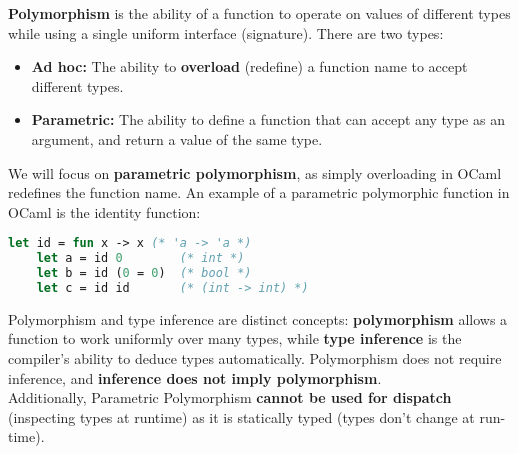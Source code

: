 \begin{Def}[Polymorphism]

    \textbf{Polymorphism} is the ability of a function to operate on values of different types while using a single uniform interface (signature).
    There are two types:
    \begin{itemize}
        \item \textbf{Ad hoc:} The ability to \textbf{overload} (redefine) a function name to accept different types.
        \item \textbf{Parametric:} The ability to define a function that can accept any type as an argument, and return a value of the same type.
    \end{itemize}
\end{Def}

\newpage
\noindent
We will focus on \textbf{parametric polymorphism}, as simply overloading in OCaml redefines the function name.
An example of a parametric polymorphic function in OCaml is the identity function:
\begin{lstlisting}[language=OCaml, numbers=none]
    let id = fun x -> x (* 'a -> 'a *)
    let a = id 0        (* int *)
    let b = id (0 = 0)  (* bool *)
    let c = id id       (* (int -> int) *)
\end{lstlisting}

\begin{Def}

    Polymorphism and type inference are distinct concepts: \textbf{polymorphism} allows a function to work uniformly over many types, while \textbf{type inference} is the compiler's ability to deduce types automatically. Polymorphism does not require inference, and \textbf{inference does not imply polymorphism}.\\

    \noindent
    Additionally, Parametric Polymorphism \textbf{cannot be used for dispatch} (inspecting types at runtime) as it is statically typed (types don't change at run-time).
    \end{Def}
    
